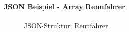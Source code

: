 \paragraph{JSON Beispiel - Array Rennfahrer}
\begin{figure}[H]
	\centering
	
	\caption{JSON-Struktur: Rennfahrer}
\end{figure}



